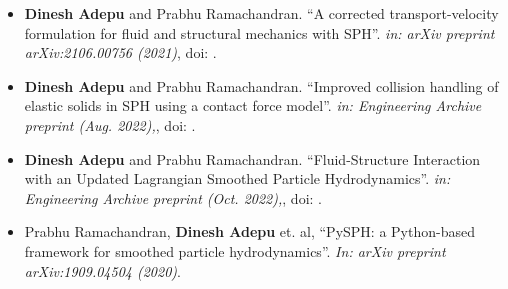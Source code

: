 %
%



\begin{itemize}
\item \textbf{Dinesh Adepu} and Prabhu Ramachandran. ``A corrected transport-velocity
formulation for fluid and structural mechanics with SPH''. \emph{in: arXiv preprint
arXiv:2106.00756 (2021)}, doi: .

\item \textbf{Dinesh Adepu} and Prabhu Ramachandran. ``Improved collision
  handling of elastic solids in SPH using a contact force model''. \emph{in:
    Engineering Archive preprint (Aug. 2022),}, doi: .

\item \textbf{Dinesh Adepu} and Prabhu Ramachandran. ``Fluid-Structure
  Interaction with an Updated Lagrangian Smoothed Particle Hydrodynamics''.
  \emph{in: Engineering Archive preprint (Oct. 2022),}, doi: .

\item Prabhu Ramachandran, \textbf{Dinesh Adepu} et. al, ``PySPH: a Python-based
  framework for smoothed particle hydrodynamics''. \emph{In: arXiv preprint
    arXiv:1909.04504 (2020)}.

\end{itemize}
